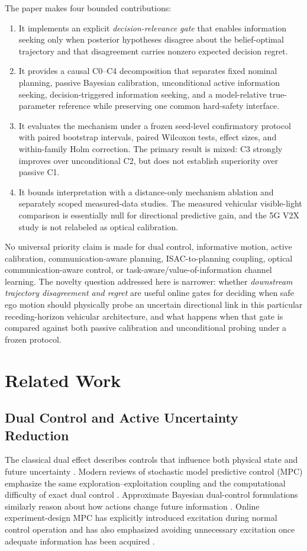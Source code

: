 \documentclass[journal]{IEEEtran}
\begin{document}
The paper makes four bounded contributions:
\begin{enumerate}
\item It implements an explicit \emph{decision-relevance gate} that enables information seeking only when posterior hypotheses disagree about the belief-optimal trajectory and that disagreement carries nonzero expected decision regret.
\item It provides a causal C0--C4 decomposition that separates fixed nominal planning, passive Bayesian calibration, unconditional active information seeking, decision-triggered information seeking, and a model-relative true-parameter reference while preserving one common hard-safety interface.
\item It evaluates the mechanism under a frozen seed-level confirmatory protocol with paired bootstrap intervals, paired Wilcoxon tests, effect sizes, and within-family Holm correction. The primary result is mixed: C3 strongly improves over unconditional C2, but does not establish superiority over passive C1.
\item It bounds interpretation with a distance-only mechanism ablation and separately scoped measured-data studies. The measured vehicular visible-light comparison is essentially null for directional predictive gain, and the 5G V2X study is not relabeled as optical calibration.
\end{enumerate}

No universal priority claim is made for dual control, informative motion, active calibration, communication-aware planning, ISAC-to-planning coupling, optical communication-aware control, or task-aware/value-of-information channel learning. The novelty question addressed here is narrower: whether \emph{downstream trajectory disagreement and regret} are useful online gates for deciding when safe ego motion should physically probe an uncertain directional link in this particular receding-horizon vehicular architecture, and what happens when that gate is compared against both passive calibration and unconditional probing under a frozen protocol.

\section{Related Work}
\subsection{Dual Control and Active Uncertainty Reduction}
The classical dual effect describes controls that influence both physical state and future uncertainty \cite{barshalom1974}. Modern reviews of stochastic model predictive control (MPC) emphasize the same exploration--exploitation coupling and the computational difficulty of exact dual control \cite{mesbah2018}. Approximate Bayesian dual-control formulations similarly reason about how actions change future information \cite{klenske2016}. Online experiment-design MPC has explicitly introduced excitation during normal control operation and has also emphasized avoiding unnecessary excitation once adequate information has been acquired \cite{heirung2015}.
\end{document}
